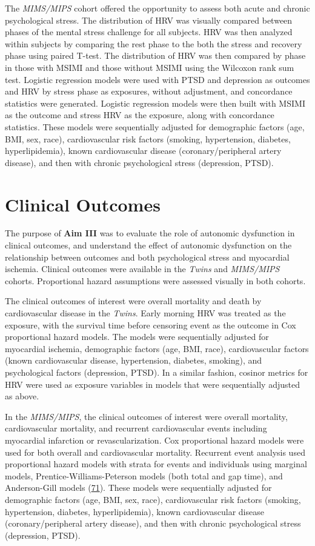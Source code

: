 \documentclass[
  11pt,
  openany]{book}
\begin{document}
The \emph{MIMS/MIPS} cohort offered the opportunity to assess both acute and chronic psychological stress.
The distribution of HRV was visually compared between phases of the mental stress challenge for all subjects.
HRV was then analyzed within subjects by comparing the rest phase to the both the stress and recovery phase using paired T-test.
The distribution of HRV was then compared by phase in those with MSIMI and those without MSIMI using the Wilcoxon rank sum test.
Logistic regression models were used with PTSD and depression as outcomes and HRV by stress phase as exposures, without adjustment, and concordance statistics were generated.
Logistic regression models were then built with MSIMI as the outcome and stress HRV as the exposure, along with concordance statistics.
These models were sequentially adjusted for demographic factors (age, BMI, sex, race), cardiovascular risk factors (smoking, hypertension, diabetes, hyperlipidemia), known cardiovascular disease (coronary/peripheral artery disease), and then with chronic psychological stress (depression, PTSD).

\hypertarget{clinical-outcomes}{%
\section{Clinical Outcomes}\label{clinical-outcomes}}

The purpose of \textbf{Aim III} was to evaluate the role of autonomic dysfunction in clinical outcomes, and understand the effect of autonomic dysfunction on the relationship between outcomes and both psychological stress and myocardial ischemia. Clinical outcomes were available in the \emph{Twins} and \emph{MIMS/MIPS} cohorts. Proportional hazard assumptions were assessed visually in both cohorts.

The clinical outcomes of interest were overall mortality and death by cardiovascular disease in the \emph{Twins}.
Early morning HRV was treated as the exposure, with the survival time before censoring event as the outcome in Cox proportional hazard models.
The models were sequentially adjusted for myocardial ischemia, demographic factors (age, BMI, race), cardiovascular factors (known cardiovascular disease, hypertension, diabetes, smoking), and psychological factors (depression, PTSD).
In a similar fashion, cosinor metrics for HRV were used as exposure variables in models that were sequentially adjusted as above.

In the \emph{MIMS/MIPS}, the clinical outcomes of interest were overall mortality, cardiovascular mortality, and recurrent cardiovascular events including myocardial infarction or revascularization.
Cox proportional hazard models were used for both overall and cardiovascular mortality.
Recurrent event analysis used proportional hazard models with strata for events and individuals using marginal models, Prentice-Williams-Peterson models (both total and gap time), and Anderson-Gill models (\protect\hyperlink{ref-Amorim2015a}{71}).
These models were sequentially adjusted for demographic factors (age, BMI, sex, race), cardiovascular risk factors (smoking, hypertension, diabetes, hyperlipidemia), known cardiovascular disease (coronary/peripheral artery disease), and then with chronic psychological stress (depression, PTSD).
\end{document}
